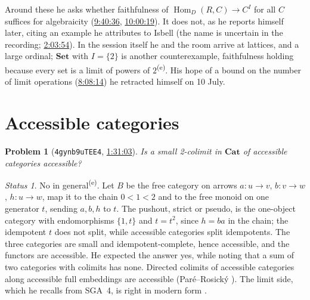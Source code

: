 \documentclass[11pt,a4paper]{amsart}
\newtheorem{problem}{Problem}
\theoremstyle{definition}
\theoremstyle{remark}
\newtheorem*{status}{Status}
\newcommand{\ts}[3]{\href{https://www.youtube.com/watch?v=#1&t=#2}{#3}}
\newcommand{\Set}{\mathbf{Set}}
\newcommand{\Cat}{\mathbf{Cat}}
\newcommand{\own}{\textsuperscript{(e)}}
\begin{document}
Around these he asks whether faithfulness of $\operatorname{Hom}_D(R,C)\to C^I$ for all $C$ suffices for algebraicity (\ts{PqCQM3Pcl6Q}{9h40m36s}{9:40:36}, \ts{PqCQM3Pcl6Q}{10h0m19s}{10:00:19}). It does not, as he reports himself later, citing an example he attributes to Isbell (the name is uncertain in the recording; \ts{4gynb9uTEE4}{2h3m54s}{2:03:54}). In the session itself he and the room arrive at lattices, and a large ordinal; $\Set$ with $I=\{2\}$ is another counterexample, faithfulness holding because every set is a limit of powers of $2$\own. His hope of a bound on the number of limit operations (\ts{PqCQM3Pcl6Q}{8h8m14s}{8:08:14}) he retracted himself on 10 July.

\section{Accessible categories}

\begin{problem}[\texttt{4gynb9uTEE4}, \ts{4gynb9uTEE4}{1h31m3s}{1:31:03}]\label{p:colim}
Is a small 2-colimit in $\Cat$ of accessible categories accessible?
\end{problem}
\begin{status}
No in general\own. Let $B$ be the free category on arrows $a\colon u\to v$, $b\colon v\to w$, $h\colon u\to w$, map it to the chain $0<1<2$ and to the free monoid on one generator $t$, sending $a,b,h$ to $t$. The pushout, strict or pseudo, is the one-object category with endomorphisms $\{1,t\}$ and $t=t^2$, since $h=ba$ in the chain; the idempotent $t$ does not split, while accessible categories split idempotents. The three categories are small and idempotent-complete, hence accessible, and the functors are accessible. He expected the answer yes, while noting that a sum of two categories with colimits has none. Directed colimits of accessible categories along accessible full embeddings are accessible (Paré--Rosický \cite{pr}). The limit side, which he recalls from SGA~4, is right in modern form \cite[ch.~5]{mp}.
\end{status}
\end{document}
